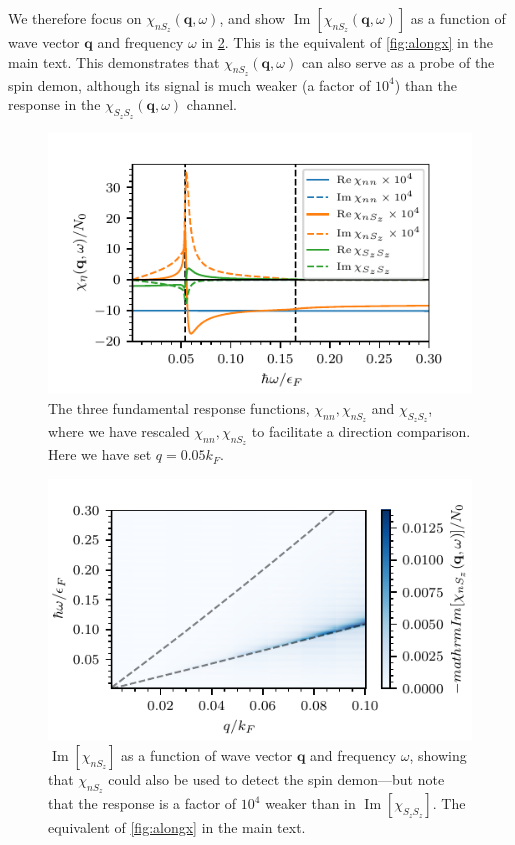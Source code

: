 \documentclass[aps,prb,reprint,twocolumns,superscriptaddress,nofootinbib]{revtex4-2}
\DeclareMathOperator{\Imm}{Im}
\newcommand{\kF}{k_{F}}
\begin{document}
	We therefore focus on $\chi_{nS_z}(\bm q,\omega)$, and show $\Imm[\chi_{nS_z}(\bm q,\omega)]$ as a function of wave vector $\bm q$ and frequency $\omega$ in \cref{fig:chi-nSz}. This is the equivalent of \cref{fig:alongx} in the main text. This demonstrates that $\chi_{nS_z}(\bm q,\omega) $ can also serve as a probe of the spin demon, although its signal is much weaker (a factor of $10^4$) than the response in the $\chi_{S_zS_z}(\bm q,\omega)$ channel.
	\begin{figure}
		\includegraphics{linecut-chi_nn}
		\caption{The three fundamental response functions, $\chi_{nn}, \chi_{nS_z}$ and $\chi_{S_zS_z}$, where we have rescaled $\chi_{nn}, \chi_{nS_z}$ to facilitate a direction comparison. Here we have set $q=0.05\kF$. \label{fig:all-chis} }
	\end{figure}
	
	\begin{figure}
		\includegraphics{nSz_3D}
		\caption{$\Imm[\chi_{nS_z}]$ as a function of wave vector $\bm q$ and frequency $\omega$, showing that $\chi_{nS_z}$ could also be used to detect the spin demon---but note that the response is a factor of $10^4$ weaker than in $\Imm[\chi_{S_zS_z}]$. The equivalent of \cref{fig:alongx} in the main text. \label{fig:chi-nSz}}
	\end{figure}
	
\end{document}
